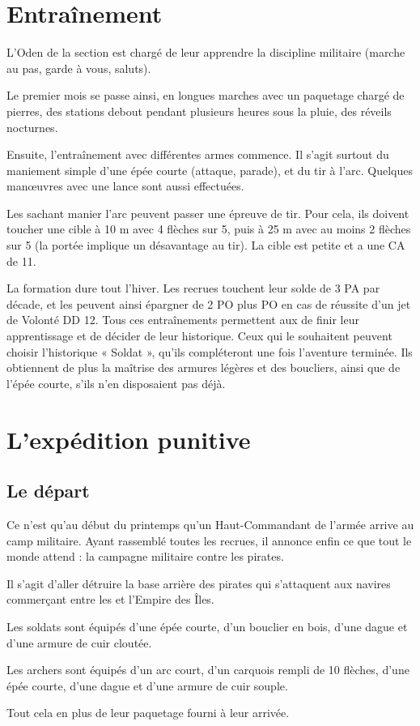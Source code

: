 \documentclass[a4paper,10pt,openany]{book}
\begin{document}
\begin{multicols}{2}
\section{Entraînement}
L’Oden de la section est chargé de leur apprendre la discipline militaire (marche au pas, garde à vous, saluts).\par Le premier mois se passe ainsi,
en longues marches avec un paquetage chargé de pierres, des stations debout pendant plusieurs heures sous la pluie, des réveils  nocturnes.\par
Ensuite, l’entraînement avec différentes armes commence. Il s’agit surtout du maniement simple d’une épée courte (attaque, parade), et du tir à l’arc.
Quelques manœuvres avec une lance sont aussi effectuées. \par Les \PJs sachant manier l’arc peuvent passer une épreuve de tir. Pour cela, ils doivent
toucher une cible à 10 m avec 4 flèches sur 5, puis à 25 m avec au moins 2 flèches sur 5 (la portée implique un désavantage au tir). La cible est
petite et a une CA de 11.\par La formation dure tout l’hiver. Les recrues touchent leur solde de 3 PA par décade, et les \PJs peuvent ainsi épargner
de 2 PO plus  PO en cas de réussite d’un jet de Volonté DD 12. Tous ces entraînements permettent aux \PJs de finir leur apprentissage et de
décider de leur historique. Ceux qui le souhaitent peuvent choisir l’historique « Soldat », qu’ils compléteront une fois l’aventure terminée. Ils
obtiennent de plus la maîtrise des armures légères et des boucliers, ainsi que de l’épée courte, s’ils n’en disposaient pas déjà.

\section{L’expédition punitive}
\subsection{Le départ}
Ce n’est qu’au début du printemps qu’un Haut-Commandant de l’armée arrive au camp militaire. Ayant rassemblé toutes les recrues, il annonce enfin ce
que tout le monde attend : la campagne militaire contre les pirates.\par Il s’agit d’aller détruire la base arrière des pirates qui s’attaquent aux
navires commerçant entre les \Royaumes et l’Empire des Îles.\par Les soldats sont équipés d’une épée courte, d’un bouclier en bois, d’une dague et
d’une armure de cuir cloutée.\par Les archers sont équipés d’un arc court, d’un carquois rempli de 10 flèches, d’une épée courte, d’une dague et d’une
armure de cuir souple.\par Tout cela en plus de leur paquetage fourni à leur arrivée.

\end{multicols}
\end{document}
